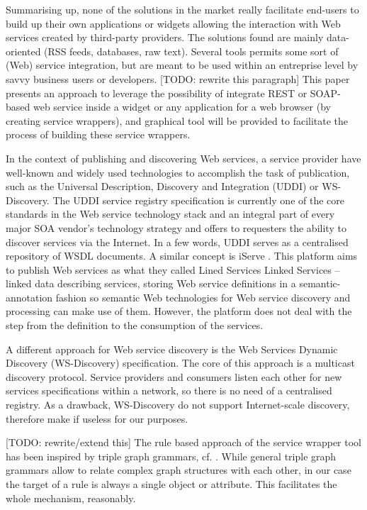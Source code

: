 Summarising up, none of the solutions in the market really facilitate end-users to build up their own applications or widgets allowing the interaction with Web services created by third-party providers. The solutions found are mainly data-oriented (RSS feeds, databases, raw text). Several tools permits some sort of (Web) service integration, but are meant to be used within an entreprise level by savvy business users or developers. [TODO: rewrite this paragraph] This paper presents an approach to leverage the possibility of integrate REST or SOAP-based web service inside a widget or any application for a web browser (by creating service wrappers), and graphical tool will be provided to facilitate the process of building these service wrappers.

In the context of publishing and discovering Web services, a service provider have well-known and widely used technologies to accomplish the task of publication, such as the Universal Description, Discovery and Integration (UDDI) or WS-Discovery. The UDDI service registry specification \cite{uddi2004} is currently one of the core standards in the Web service technology stack and an integral part of every major SOA vendor's technology strategy and offers to requesters the ability to discover services via the Internet. In a few words, UDDI serves as a centralised repository of WSDL documents. A similar concept is iServe \cite{pedrinaci_ores2010}. This platform aims to publish Web services as what they called Lined Services Linked Services --linked data describing services, storing Web service definitions in a semantic-annotation fashion so semantic Web technologies for Web service discovery and processing can make use of them. However, the platform does not deal with the step from the definition to the consumption of the services.

A different approach for Web service discovery is the Web Services Dynamic Discovery (WS-Discovery) specification. The core of this approach is a multicast discovery protocol. Service providers and consumers  listen each other for new services specifications within a network, so there is no need of a centralised registry. As a drawback, WS-Discovery do not support Internet-scale discovery, therefore make if useless for our purposes.

[TODO: rewrite/extend this] The rule based approach of the service wrapper tool has been inspired by triple graph grammars, cf. \cite{schurr94}. While general triple graph grammars allow to relate complex graph structures with each other, in our case the target of a rule is always a single object or attribute. This facilitates the whole mechanism, reasonably. 
